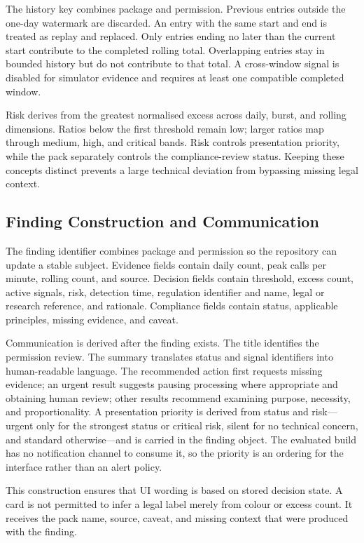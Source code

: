 The history key combines package and permission. Previous entries outside the one-day watermark are discarded. An entry with the same start and end is treated as replay and replaced. Only entries ending no later than the current start contribute to the completed rolling total. Overlapping entries stay in bounded history but do not contribute to that total. A cross-window signal is disabled for simulator evidence and requires at least one compatible completed window.

Risk derives from the greatest normalised excess across daily, burst, and rolling dimensions. Ratios below the first threshold remain low; larger ratios map through medium, high, and critical bands. Risk controls presentation priority, while the pack separately controls the compliance-review status. Keeping these concepts distinct prevents a large technical deviation from bypassing missing legal context.

\subsection{Finding Construction and Communication}

The finding identifier combines package and permission so the repository can update a stable subject. Evidence fields contain daily count, peak calls per minute, rolling count, and source. Decision fields contain threshold, excess count, active signals, risk, detection time, regulation identifier and name, legal or research reference, and rationale. Compliance fields contain status, applicable principles, missing evidence, and caveat.

Communication is derived after the finding exists. The title identifies the permission review. The summary translates status and signal identifiers into human-readable language. The recommended action first requests missing evidence; an urgent result suggests pausing processing where appropriate and obtaining human review; other results recommend examining purpose, necessity, and proportionality. A presentation priority is derived from status and risk—urgent only for the strongest status or critical risk, silent for no technical concern, and standard otherwise—and is carried in the finding object. The evaluated build has no notification channel to consume it, so the priority is an ordering for the interface rather than an alert policy.

This construction ensures that UI wording is based on stored decision state. A card is not permitted to infer a legal label merely from colour or excess count. It receives the pack name, source, caveat, and missing context that were produced with the finding.

